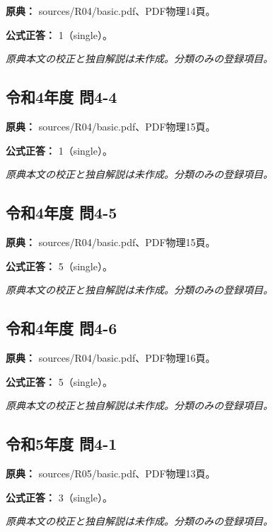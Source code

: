 \noindent\textbf{原典：} sources/R04/basic.pdf、PDF物理14頁。

\textbf{公式正答：} 1（single）。

\par\textit{原典本文の校正と独自解説は未作成。分類のみの登録項目。}

\subsection{令和4年度 問4-4}
\label{q:r04-reg-basic-4-4}

\noindent\textbf{原典：} sources/R04/basic.pdf、PDF物理15頁。

\textbf{公式正答：} 1（single）。

\par\textit{原典本文の校正と独自解説は未作成。分類のみの登録項目。}

\subsection{令和4年度 問4-5}
\label{q:r04-reg-basic-4-5}

\noindent\textbf{原典：} sources/R04/basic.pdf、PDF物理15頁。

\textbf{公式正答：} 5（single）。

\par\textit{原典本文の校正と独自解説は未作成。分類のみの登録項目。}

\subsection{令和4年度 問4-6}
\label{q:r04-reg-basic-4-6}

\noindent\textbf{原典：} sources/R04/basic.pdf、PDF物理16頁。

\textbf{公式正答：} 5（single）。

\par\textit{原典本文の校正と独自解説は未作成。分類のみの登録項目。}

\subsection{令和5年度 問4-1}
\label{q:r05-reg-basic-4-1}

\noindent\textbf{原典：} sources/R05/basic.pdf、PDF物理13頁。

\textbf{公式正答：} 3（single）。

\par\textit{原典本文の校正と独自解説は未作成。分類のみの登録項目。}


